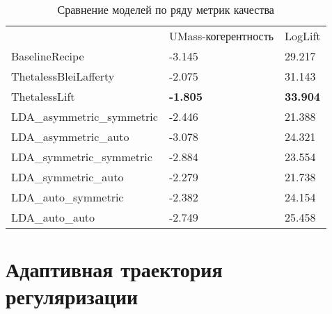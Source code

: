 \begin{table}[]

\begin{tabular}{lll}

                         & UMass-когерентность & LogLift             \\

BaselineRecipe           & -3.145         & 29.217         \\

ThetalessBleiLafferty   & -2.075         & 31.143           \\

ThetalessLift           & \textbf{-1.805}  & \textbf{33.904} \\

LDA\_asymmetric\_symmetric & -2.446          & 21.388           \\

LDA\_asymmetric\_auto      & -3.078          & 24.321          \\

LDA\_symmetric\_symmetric  & -2.884          & 23.554         \\

LDA\_symmetric\_auto       & -2.279         & 21.738          \\

LDA\_auto\_symmetric       & -2.382           & 24.154          \\

LDA\_auto\_auto            & -2.749          & 25.458

\end{tabular}

\label{tab:better_baseline}

\caption{Сравнение моделей по ряду метрик качества}

\end{table} 



\section{Адаптивная траектория регуляризации}



